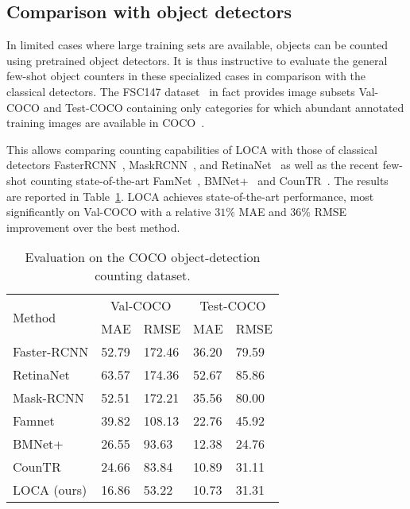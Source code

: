 \documentclass[10pt,twocolumn,letterpaper]{article}
\newcommand*\circledd[1]{\tikz[baseline=(char.base)]{
            \node[shape=circle,draw,inner sep=0.15pt] (char) {#1};}}
\newcommand{\first}[1]{{#1\raisebox{0.8pt}{\footnotesize \color{gold} \circledd{1}}}}
\newcommand{\second}[1]{{#1\raisebox{0.8pt}{\footnotesize \color{silver} \circledd{2}}}}
\newcommand{\third}[1]{{#1\raisebox{0.8pt}{\footnotesize \color{bronze} \circledd{3}}}}
\begin{document}
\subsection{Comparison with object detectors} 
\label{sec:obj_det}

In limited cases where large training sets are available, objects can be counted using pretrained object detectors.
It is thus instructive to evaluate the general few-shot object counters in these specialized cases in comparison with the classical detectors. The FSC147 dataset~\cite{famnet} in fact provides image subsets Val-COCO and Test-COCO containing only categories for which abundant annotated training images are available in COCO~\cite{cocodata}. 

This allows comparing counting capabilities of LOCA with those of classical detectors FasterRCNN~\cite{fasterrcnn}, MaskRCNN~\cite{maskrcnn}, and RetinaNet~\cite{retinanet} as well as the recent few-shot counting state-of-the-art FamNet~\cite{famnet}, BMNet+~\cite{bmnet} and CounTR~\cite{countr}. The results are reported in Table~\ref{tab:results_coco}. LOCA achieves state-of-the-art performance, most significantly on Val-COCO with a relative $31\%$ MAE and $36\%$ RMSE improvement over the best method.





\begin{table}[htbp]
    \centering
    \begin{tabular}{l l l l l}\toprule
        \multirow{2}{*}{Method}& \multicolumn{2}{c}{Val-COCO} & \multicolumn{2}{c}{Test-COCO} \\
        & MAE & RMSE & MAE & RMSE \\ 
        \midrule
        Faster-RCNN \cite{fasterrcnn} & 52.79 & 172.46 & 36.20 & 79.59 \\
        RetinaNet \cite{retinanet} & 63.57 & 174.36 & 52.67 & 85.86 \\
        Mask-RCNN \cite{maskrcnn} & 52.51 & 172.21 & 35.56 & 80.00 \\
        Famnet \cite{famnet} & 39.82 & 108.13 & 22.76 & 45.92 \\
        BMNet+ \cite{bmnet} & \third{26.55} & \third{93.63} & \third{12.38} & \first{24.76} \\
        CounTR \cite{countr} & \second{24.66} & \second{83.84} & \second{10.89} & \second{31.11} \\
        LOCA (ours) & \first{16.86} & \first{53.22} & \first{10.73} & \third{31.31} \\
        \bottomrule
    \end{tabular}
    \caption{Evaluation on the COCO object-detection counting dataset.}
    \label{tab:results_coco}
\end{table}
\end{document}
